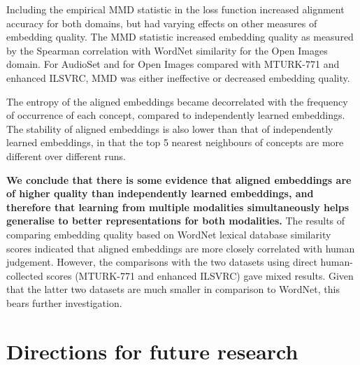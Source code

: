Including the empirical MMD statistic in the loss function increased alignment accuracy for both domains, but had varying effects on other measures of embedding quality. The MMD statistic increased embedding quality as measured by the Spearman correlation with WordNet similarity for the Open Images domain. For AudioSet and for Open Images compared with MTURK-771 and enhanced ILSVRC, MMD was either ineffective or decreased embedding quality. 

The entropy of the aligned embeddings became decorrelated with the frequency of occurrence of each concept, compared to independently learned embeddings. The stability of aligned embeddings is also lower than that of independently learned embeddings, in that the top 5 nearest neighbours of concepts are more different over different runs.

\textbf{We conclude that there is some evidence that aligned embeddings are of higher quality than independently learned embeddings, and therefore that learning from multiple modalities simultaneously helps generalise to better representations for both modalities.} The results of comparing embedding quality based on WordNet lexical database similarity scores indicated that aligned embeddings are more closely correlated with human judgement. However, the comparisons with the two datasets using direct human-collected scores (MTURK-771 and enhanced ILSVRC) gave mixed results. Given that the latter two datasets are much smaller in comparison to WordNet, this bears further investigation. 




\section{Directions for future research}

